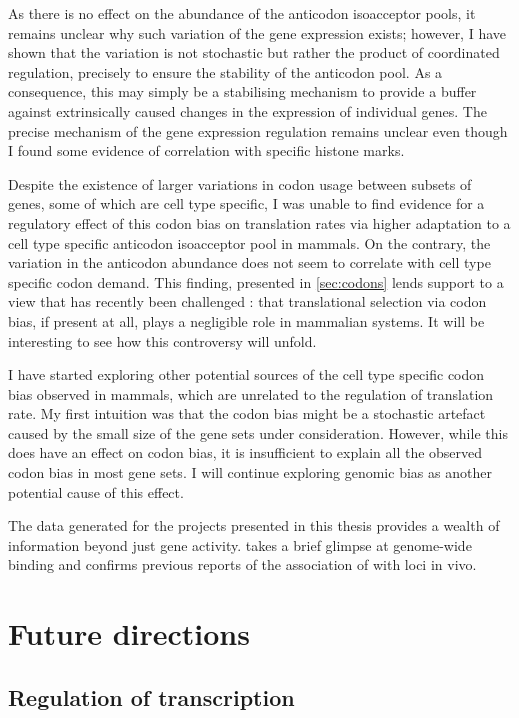 As there is no effect on the abundance of the \trna anticodon isoacceptor pools,
it remains unclear why such variation of the \trna gene expression exists;
however, I have shown that the variation is not stochastic but rather the
product of coordinated regulation, precisely to ensure the stability of the
anticodon pool. As a consequence, this may simply be a stabilising mechanism to
provide a buffer against extrinsically caused changes in the expression of
individual \trna genes. The precise mechanism of the \trna gene expression
regulation remains unclear even though I found some evidence of correlation with
specific histone marks.

Despite the existence of larger variations in codon usage between subsets of
genes, some of which are cell type specific, I was unable to find evidence for a
regulatory effect of this codon bias on translation rates via higher adaptation
to a cell type specific \trna anticodon isoacceptor pool in mammals. On the
contrary, the variation in the \trna anticodon abundance does not seem to
correlate with cell type specific codon demand. This finding, presented in
\cref{sec:codons} lends support to a view that has recently been challenged
\citep{Gingold:2014,Wilusz:2015}: that translational selection via codon bias,
if present at all, plays a negligible role in mammalian systems. It will be
interesting to see how this controversy will unfold.

I have started exploring other potential sources of the cell type specific codon
bias observed in mammals, which are unrelated to the regulation of translation
rate. My first intuition was that the codon bias might be a stochastic artefact
caused by the small size of the gene sets under consideration. However, while
this does have an effect on codon bias, it is insufficient to explain all the
observed codon bias in most gene sets. I will continue exploring genomic \gc
bias as another potential cause of this effect.

The  \chipseq data generated for the projects presented in this thesis
provides a wealth of information beyond just \trna gene activity.
 takes a brief glimpse at genome-wide  binding and confirms
previous reports of the association of  with \transsine loci in vivo.

\section{Future directions}

\subsection{Regulation of  transcription}

